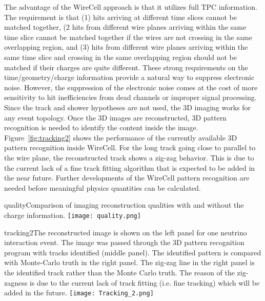 The advantage of the WireCell approach is that it utilizes full TPC 
information. The requirement is that (1) hits arriving at different time slices cannot be
matched together, (2 hits from different wire planes arriving within the same time slice
cannot be matched together if the wires are not crossing in the same overlapping region, 
and (3) hits from different wire planes arriving within the same time slice and crossing
in the same overlapping region should not be matched if their charges are quite different. 
These strong requirements 
on the time/geometry/charge information provide a natural way to suppress electronic noise.
%
However, the suppression of the electronic noise comes at the cost of more
sensitivity to hit inefficiencies from dead channels or improper signal processing.
 Since the track and shower hypotheses
are not used, the 3D imaging works for any event topology. Once the 3D
images are reconstructed, 3D pattern recognition is needed to identify 
the content inside the image. Figure~\ref{fig:tracking2} shows the 
performance of the currently available 3D pattern recognition inside
WireCell. For the long track going close to parallel to the wire plane, the reconstructed
track shows a zig-zag behavior. This is due to the current lack of a fine track fitting algorithm
that is expected to be added in the near future. 
Further developments of the WireCell pattern recognition 
are needed before meaningful physics quantities can be calculated.
%
\begin{cdrfigure}{quality}{Comparison of imaging reconstruction 
qualities with and without the charge information. }
\texttt{[image: quality.png]}
\end{cdrfigure}
%
%
\begin{cdrfigure}{tracking2}{The reconstructed image is shown 
on the left panel for one neutrino interaction event. The image 
was passed through the 3D pattern recognition program with tracks 
identified (middle panel). The identified pattern is compared 
with Monte-Carlo truth in the right panel. The zig-zag line in the right 
panel is the identified track rather than the Monte Carlo truth. 
The reason of the zig-zagness is due to the current lack of track fitting 
(i.e. fine tracking) which will be added in the future. }
 \texttt{[image: Tracking\_2.png]}
\end{cdrfigure}


